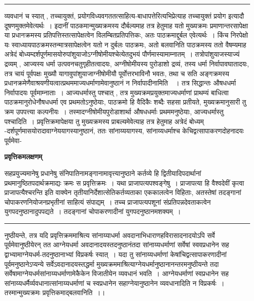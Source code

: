 \documentclass[11pt, openany]{book}
\begin{document}
\hrule
\vspace{3mm}
\noindent
व्यवधानं च स्यात् , तच्चायुक्तं,   प्रयोगविध्यवगततत्साहित्य-बाधापत्तेरित्यभिप्रेत्याह  {\qt तच्चायुक्तं प्रयोग} इत्यादौ दूषणमुक्तमेवेत्यर्थः~। इदानीं पाठकमान्मुख्यक्रमस्य दौर्बल्यमाह तत्र हेतुमाह यतो मुख्यक्रमः प्रमाणान्तरसापेक्षा या प्रधानक्रमस्य प्रतिपत्तिस्तत्सापेक्षत्वेन विलम्बितप्रतिपत्तिकः, अतः पाठक्रमाद्दुर्बल एवेत्यर्थः~। किंच निरपेक्षो यः स्वाध्यायपाठक्रमस्तन्मात्रसापेक्षत्वेन यतो न दुर्बलः पाठक्रमः, अतो बलवानिति पाठक्रमस्य ततो वैषम्यमाह अत्रेदं बोध्यम्\textendash दर्शपूर्णमासयोरुपांशुयाजोऽग्नीषोमीयश्चेत्येतदुभयं पौर्णमास्यामाम्नातम्~। तत्रोपांशुयाजस्याज्यं द्रव्यम् , आज्यस्य धर्मा उत्पवनचतुगृहीतत्वादयः, अग्नीषोमीयस्य पुरोडाशो द्रव्यं, तस्य धर्मा निर्वापावघातादयः, तत्र चायं पूर्वपक्षः {\qt मुख्यौ यागावुपांशुयाजाग्नीषोमीयौ पूर्वोत्तरभाविनौ भवतः, तथा च सति अङ्गक्रमस्य प्रधानक्रमेणैवाश्रयणीयत्वात्प्रथममाज्यधर्माणामेवानुष्ठानं न निर्वापादीनामिति~}~। तत्र सिद्धान्तः {\qt औषधधर्मा निर्वापादयः पूर्वमाम्नाताः}~। आज्यधर्मास्तु पश्चात् , तत्र मुख्यक्रमप्रयुक्तमाज्यधर्माणां प्राथम्यं बाधित्वा पाठक्रमानुरोधेनौषधधर्मा एव प्रथमतोऽनुष्ठेयाः, पाठक्रमो हि वैदिकैः शब्दैः सहसा प्रतीयते, मुख्यक्रमानुसारी तु क्रम उपपत्त्या
कल्पनीयः~। तस्मादग्नीषोमीयपुरोडाशार्था औषधधर्माः प्रथममनुष्ठेयाः, आज्यधर्मास्तु पश्चादिति~। प्रवृत्तिक्रमापेक्षया तु मुख्यक्रमस्य प्राबल्यमेवेत्याह तत्र हेतुमाह अत्रेदं बोध्यम् -दर्शपूर्णमासयोरादावाग्नेययागस्यानुष्ठानं, ततः सांनाय्ययागस्य, सांनाय्यधर्माश्च केचिद्वत्सापाकरणदोहनादयः पूर्वमेवा-
\newpage
\begin{center}
 \textbf{प्रवृत्तिकमलक्षणम्}   
\end{center}
 
{\bl सहप्रयुज्यमानेषु प्रधानेषु संनिपातिनामङ्गानामावृत्त्यानुष्ठाने कर्तव्ये हि द्वितीयादिपदार्थानां प्रथमानुष्ठितपदार्थक्रमाद्यः क्रमः स प्रवृत्तिक्रमः~। यथा प्राजापत्यपश्वङ्गेषु~। प्राजापत्या हि {\qtl वैश्वदेवीं कृत्वा प्राजापत्यैश्चरन्ति} इति वाक्येन तृतीयानिर्देशात्सेतिकर्तव्यताका एककालत्वेन विहिताः, अतस्तेषां तदङ्गानां चोपाकरणनियोजनप्रभृतीनां साहित्यं संपाद्यम्~। तच्च प्राजापत्यपशूनां संप्रतिपन्नदेवताकत्वेन युगपदनुष्ठानादुपपद्यते~। तदङ्गानां चोपाकरणादीनां युगपदनुष्ठानमशक्यम्~।}\\
\hrule
\vspace{3mm}
\noindent
नुष्ठीयन्ते, तत्र यदि प्रवृत्तिक्रममाश्रित्य सांनाय्याधर्मा अवदानाभिधाराणहविरासादनादयोऽपि सर्वे पूर्वमेवानुष्ठीयेरन् तत आग्नेयधर्मा अवदानादयस्तदनुष्ठानं\footnotemarkA[1] तदा सांनाय्यधर्माणां {\br सर्वेषां} स्ववप्रधानेन सह द्वाभ्यामाग्नेयधर्म-तदनुष्ठानाभ्यां विप्रकर्षः स्यात्~। यदा तु
सांनाय्यधर्माणां केषांचिद्वत्सापाकरणादीनां पूर्वमनुष्ठानेऽप्यन्ये सर्वेऽवदानादयस्तद्धर्मा मुख्यक्रममाश्रित्याग्नेयधर्मानुष्ठानानन्तरमनुष्ठीयन्ते तदा
सर्वेषामाग्नेयधर्मसांनाय्यधर्माणामेकैकेन विजातीयेन व्यवधानं भवति~। आग्नेयधर्माणां स्वप्रधानेन सह सांनाय्यधर्मैर्व्यवधानात्सांनाय्यधर्माणां च स्वप्रधानेन सहाग्नेयानुष्ठानेन व्यवधानादिति न विप्रकर्षः~। तस्मान्मुख्यक्रमः प्रवृत्तिकमाद्बलवानिति~।। \\
\end{document}
